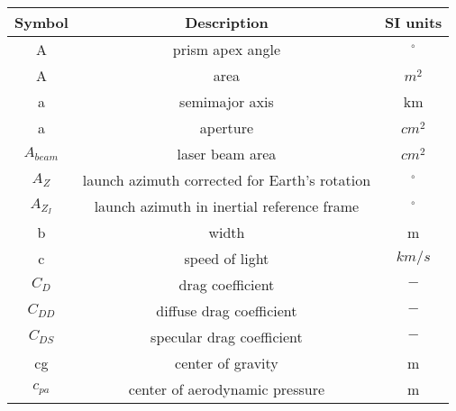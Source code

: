 \begin{center}
\begin{longtable}{c|c|c}

\textbf{Symbol} & \textbf{Description} & \textbf{SI units} \\\hline\hline
A																		& prism apex angle																												& $^\circ$ \\

A																		& area 																																		& $m^2$ \\

a																		& semimajor axis 																													& km \\

a                                   & aperture																																& $cm^2$ \\

$A_{beam}$                    	    & laser beam area                               													& $cm^2$ \\

$A_Z$																& launch azimuth corrected for Earth's rotation  													& $^\circ$ \\

$A_{Z_I}$                           & launch azimuth in inertial reference frame  														& $^\circ$ \\

b                                  	& width                                       														& m \\

c                                   & speed of light                           																& $km/s$ \\

$C_D$																& drag coefficient 																												& $-$ \\

$C_{DD}$													  & diffuse drag coefficient																								& $-$ \\

$C_{DS}$						       					& specular drag coefficient 																							& $-$ \\

cg                                  & center of gravity                         															& m \\

$c_{pa}$                            & center of aerodynamic pressure            															& m \\


\end{longtable}
\end{center}

